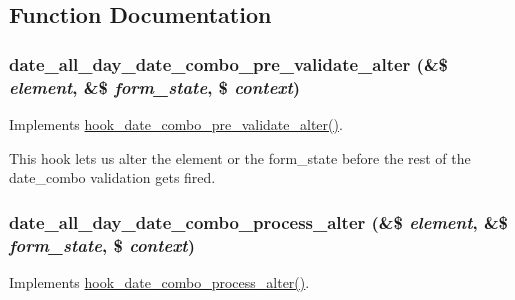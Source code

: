 \subsection{Function Documentation}
\hypertarget{date__all__day_8module_a2d4971b95fc7ced169a5884f7a743d25}{
\subsubsection[{date\_\-all\_\-day\_\-date\_\-combo\_\-pre\_\-validate\_\-alter}]{\setlength{\rightskip}{0pt plus 5cm}date\_\-all\_\-day\_\-date\_\-combo\_\-pre\_\-validate\_\-alter (\&\$ {\em element}, \/  \&\$ {\em form\_\-state}, \/  \$ {\em context})}}
\label{date__all__day_8module_a2d4971b95fc7ced169a5884f7a743d25}
Implements \hyperlink{date_8api_8php_acb65970e9f533601f60f43e490e85356}{hook\_\-date\_\-combo\_\-pre\_\-validate\_\-alter()}.

This hook lets us alter the element or the form\_\-state before the rest of the date\_\-combo validation gets fired. \hypertarget{date__all__day_8module_ac553505a37b6dc07558e764e9b7e11af}{
\subsubsection[{date\_\-all\_\-day\_\-date\_\-combo\_\-process\_\-alter}]{\setlength{\rightskip}{0pt plus 5cm}date\_\-all\_\-day\_\-date\_\-combo\_\-process\_\-alter (\&\$ {\em element}, \/  \&\$ {\em form\_\-state}, \/  \$ {\em context})}}
\label{date__all__day_8module_ac553505a37b6dc07558e764e9b7e11af}
Implements \hyperlink{date_8api_8php_abbae4e6ce7b9d70996e06174fc11497c}{hook\_\-date\_\-combo\_\-process\_\-alter()}.


